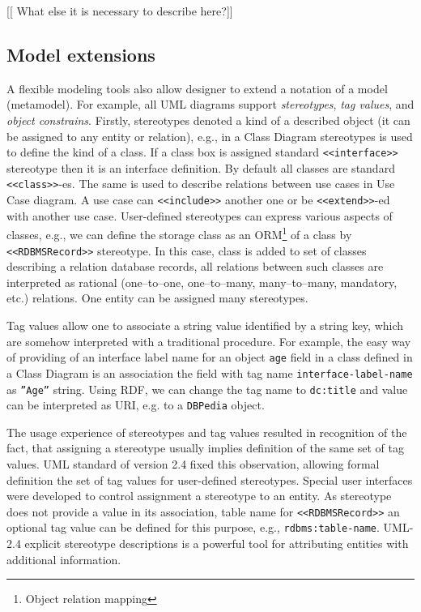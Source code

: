 \documentclass[12pt,a4paper]{llncs}
\begin{document}
[[ What else it is necessary to describe here?]]

\subsection{Model extensions}
\label{sec:mod-ext}

A flexible modeling tools also allow designer to extend a notation of a model (metamodel).  For example, all UML diagrams support \emph{stereotypes}, \emph{tag values}, and \emph{object constrains}.  Firstly, stereotypes denoted a kind of a described object (it can be assigned to any entity or relation), e.g., in a Class Diagram stereotypes is used to define the kind of a class.  If a class box is assigned standard \texttt{<<interface>>} stereotype then it is an interface definition.  By default all classes are standard \texttt{<<class>>}-es.  The same is used to describe relations between use cases in Use Case diagram.  A use case can \texttt{<<include>>} another one or be \texttt{<<extend>>}-ed with another use case.  User-defined stereotypes can express various aspects of classes, e.g., we can define the storage class as an ORM\footnote{Object relation mapping} of a class by \texttt{<<RDBMSRecord>>} stereotype.  In this case, class is added to set of classes describing a relation database records, all relations between such classes are interpreted as rational (one--to--one, one--to--many, many--to--many, mandatory, etc.) relations.  One entity can be assigned many stereotypes.

Tag values allow one to associate a string value identified by a string key, which are somehow interpreted with a traditional procedure.  For example, the easy way of providing of an interface label name for an object \texttt{age} field in a class defined in a Class Diagram is an association the field with tag name \texttt{interface-label-name} as \texttt{''Age''} string.  Using RDF, we can change the tag name to \texttt{dc:title} and value can be interpreted as URI, e.g. to a \texttt{DBPedia} object.

The usage experience of stereotypes and tag values resulted in recognition of the fact, that assigning a stereotype usually implies definition of the same set of tag values.  UML standard of version 2.4 fixed this observation, allowing formal definition the set of tag values for user-defined stereotypes.  Special user interfaces were developed to control assignment a stereotype to an entity.  As stereotype does not provide a value in its association, table name for \texttt{<<RDBMSRecord>>} an optional tag value can be defined for this purpose, e.g., \texttt{rdbms:table-name}.  UML-2.4 explicit stereotype descriptions is a powerful tool for attributing entities with additional information.
\end{document}
